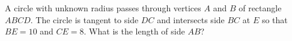 A circle with unknown radius passes through vertices $A$ and $B$ of rectangle $ABCD$. The circle is tangent to side $DC$ and intersects side $BC$ at $E$ so that $BE = 10$ and $CE = 8$. What is the length of side $AB$?
